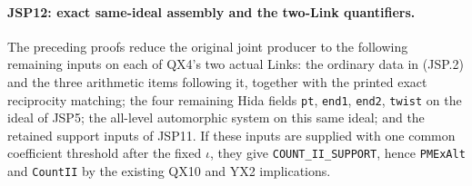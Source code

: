 \paragraph{JSP12: exact same-ideal assembly and the two-Link quantifiers.}
\label{claim:JSP12}
The preceding proofs reduce the original joint producer to the
following remaining inputs on each of QX4's two actual Links:
the ordinary data in (JSP.2) and the three arithmetic items
following it, together with the printed exact reciprocity matching;
the four remaining Hida fields
\texttt{pt}, \texttt{end1}, \texttt{end2}, \texttt{twist}
on the ideal of JSP5; the all-level automorphic system on this
same ideal; and the retained support inputs of JSP11.
If these inputs are supplied with one common coefficient
threshold after the fixed $\iota$, they give
\texttt{COUNT\_II\_SUPPORT}, hence \texttt{PMExAlt} and
\texttt{CountII} by the existing QX10 and YX2 implications.
